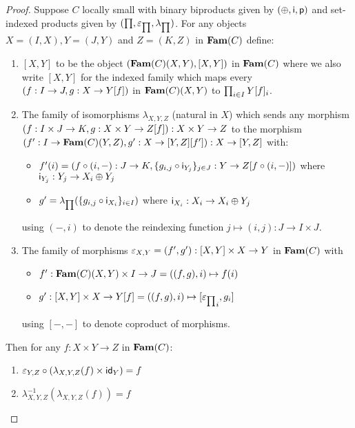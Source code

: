 \begin{proof}
Suppose $C$ locally small with binary biproducts given by $(\oplus,\mathsf{i},\mathsf{p})$ and set-indexed products
given by $(\prod,\varepsilon_{\prod},\lambda_{\prod})$. For any objects $X = (I, X), Y = (J, Y)$ and $Z = (K, Z)$ in
$\mathbf{Fam}(C)$ define:

\begin{enumerate}
\item $[X, Y]$ to be the object $(\mathbf{Fam}(C)(X,Y),[X, Y])$ in $\mathbf{Fam}(C)$ where we also write $[X,Y]$ for the
indexed family which maps every $(f: I \to J, g: X \to Y[f])$ in $\mathbf{Fam}(C)(X,Y)$ to $\prod_{i \in
I}Y[f]_i$.
\item The family of isomorphisms $\lambda_{X,Y,Z}$ (natural in $X$) which sends any morphism $(f: I \times J
\to K, g: X \times Y \to Z[f]): X \times Y \to Z$ to the morphism $(f': I \to \mathbf{Fam}(C)(Y,Z), g': X
\to [Y, Z][f']): X \to [Y, Z]$ with:
\begin{itemize}
\item $f'(i) = (f \circ (i, -): J \to K, \{g_{i,j} \circ \mathsf{i}_{Y_j}\}_{j \in J}: Y \to Z[f \circ (i,
-)])$ where $\mathsf{i}_{Y_j}: Y_j \to X_i \oplus Y_j$
\item $g' = \lambda_{\prod}(\{g_{i, j} \circ \mathsf{i}_{X_i} \}_{i \in I})$ where $\mathsf{i}_{X_i}: X_i \to X_i \oplus
Y_j$
\end{itemize}
using $(-, i)$ to denote the reindexing function $j \mapsto (i, j): J \to I \times J$.
\item The family of morphisms $\varepsilon_{X,Y} = (f', g'): [X, Y] \times X \to Y$ in $\mathbf{Fam}(C)$ with
\begin{itemize}
\item $f': \mathbf{Fam}(C)(X,Y) \times I \to J = ((f, g), i) \mapsto f(i)$
\item $g': [X, Y] \times X \to Y[f] = ((f, g), i) \mapsto [{\varepsilon_{\prod}}_i, g_i]$
\end{itemize}
using $[-,-]$ to denote coproduct of morphisms.
\end{enumerate}
Then for any $f: X \times Y \to Z$ in $\mathbf{Fam}(C)$:
\begin{enumerate}
\item $\varepsilon_{Y,Z} \circ (\lambda_{X,Y,Z}(f) \times \mathsf{id}_{Y}) = f$
\item $\lambda^{-1}_{X,Y,Z}(\lambda_{X,Y,Z}(f)) = f$
\end{enumerate}
\end{proof}
